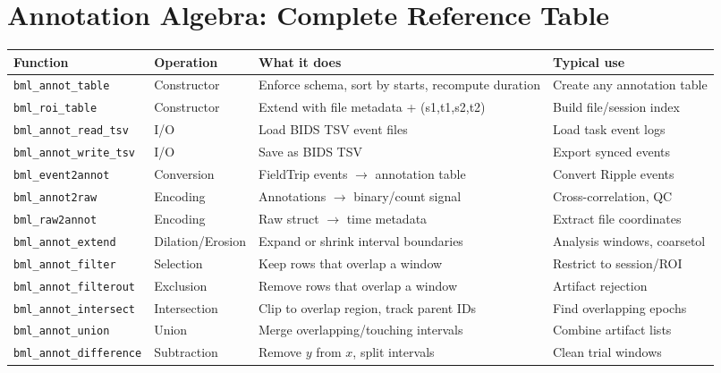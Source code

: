\documentclass[11pt, a4paper]{article}
\begin{document}
\section{Annotation Algebra: Complete Reference Table}
\label{sec:reference}

\begin{center}
\small
\begin{longtable}{L{3.5cm} L{2.5cm} L{3.5cm} L{4cm}}
\toprule
\textbf{Function} & \textbf{Operation} & \textbf{What it does} & \textbf{Typical use} \\
\midrule
\endhead
\texttt{bml\_annot\_table} & Constructor & Enforce schema, sort by starts, recompute duration & Create any annotation table \\
\texttt{bml\_roi\_table} & Constructor & Extend with file metadata + (s1,t1,s2,t2) & Build file/session index \\
\texttt{bml\_annot\_read\_tsv} & I/O & Load BIDS TSV event files & Load task event logs \\
\texttt{bml\_annot\_write\_tsv} & I/O & Save as BIDS TSV & Export synced events \\
\texttt{bml\_event2annot} & Conversion & FieldTrip events $\to$ annotation table & Convert Ripple events \\
\texttt{bml\_annot2raw} & Encoding & Annotations $\to$ binary/count signal & Cross-correlation, QC \\
\texttt{bml\_raw2annot} & Encoding & Raw struct $\to$ time metadata & Extract file coordinates \\
\texttt{bml\_annot\_extend} & Dilation/Erosion & Expand or shrink interval boundaries & Analysis windows, coarsetol \\
\texttt{bml\_annot\_filter} & Selection & Keep rows that overlap a window & Restrict to session/ROI \\
\texttt{bml\_annot\_filterout} & Exclusion & Remove rows that overlap a window & Artifact rejection \\
\texttt{bml\_annot\_intersect} & Intersection & Clip to overlap region, track parent IDs & Find overlapping epochs \\
\texttt{bml\_annot\_union} & Union & Merge overlapping/touching intervals & Combine artifact lists \\
\texttt{bml\_annot\_difference} & Subtraction & Remove $y$ from $x$, split intervals & Clean trial windows \\

\end{longtable}
\end{center}
\end{document}
